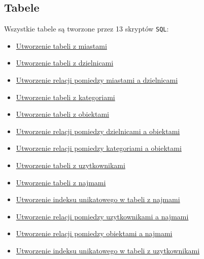 \subsection{Tabele}

Wszystkie tabele są tworzone przez 13 skryptów \texttt{SQL}:
\begin{itemize}
	\item \href{run:Sources/SQL/1. Tabele/001_Utworzenie_tabeli_z_miastami.sql}{Utworzenie tabeli z miastami}
	\item \href{run:Sources/SQL/1. Tabele/002_Utworzenie_tabeli_z_dzielnicami.sql}{Utworzenie tabeli z dzielnicami}
	\item \href{run:Sources/SQL/1. Tabele/003_Utworzenie_relacji_pomiedzy_miastami_a_dzielnicami.sql}{Utworzenie relacji pomiedzy miastami a dzielnicami}
	\item \href{run:Sources/SQL/1. Tabele/004_Utworzenie_tabeli_z_kategoriami.sql}{Utworzenie tabeli z kategoriami}
	\item \href{run:Sources/SQL/1. Tabele/005_Utworzenie_tabeli_z_obiektami.sql}{Utworzenie tabeli z obiektami}
	\item \href{run:Sources/SQL/1. Tabele/006_Utworzenie_relacji_pomiedzy_dzielnicami_a_obiektami.sql}{Utworzenie relacji pomiedzy dzielnicami a obiektami}
	\item \href{run:Sources/SQL/1. Tabele/007_Utworzenie_relacji_pomiedzy_kategoriami_a_obiektami.sql}{Utworzenie relacji pomiedzy kategoriami a obiektami}
	\item \href{run:Sources/SQL/1. Tabele/008_Utworzenie_tabeli_z_uzytkownikami.sql}{Utworzenie tabeli z uzytkownikami}
	\item \href{run:Sources/SQL/1. Tabele/009_Utworzenie_tabeli_z_najmami.sql}{Utworzenie tabeli z najmami}
	\item \href{run:Sources/SQL/1. Tabele/010_Utworzenie_indeksu_unikatowego_w_tabeli_z_najemcami.sql}{Utworzenie indeksu unikatowego w tabeli z najmami}
	\item \href{run:Sources/SQL/1. Tabele/011_Utworzenie_relacji_pomiedzy_uzytkownikami_a_najmami.sql}{Utworzenie relacji pomiedzy uzytkownikami a najmami}
	\item \href{run:Sources/SQL/1. Tabele/012_Utworzenie_relacji_pomiedzy_obiektami_a_najmami.sql}{Utworzenie relacji pomiedzy obiektami a najmami}
	\item \href{run:Sources/SQL/1. Tabele/013_Utworzenie_indeksu_unikatowego_w_tabeli_z_uzytkownikami.sql}{Utworzenie indeksu unikatowego w tabeli z uzytkownikami}
\end{itemize}

